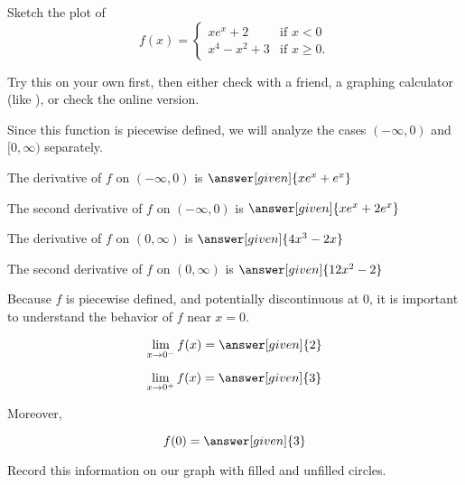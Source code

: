 \documentclass{ximera}
\begin{document}
\begin{example}
\begin{explanation}
\begin{hint}
\end{hint}

\end{explanation}
\end{example}

\begin{example}
Sketch the plot of 
\[
f(x) = \begin{cases} xe^x+2 &\text{if $x<0$} \\
x^4-x^2+3 &\text{if $x \geq 0$}.
\end{cases}
\]
\begin{explanation}

 Try this on your own first, then either check with a friend, a graphing calculator (like ), or check the online version.

\begin{hint}
	Since this function is piecewise defined, we will analyze the cases $(-\infty,0)$ and $[0,\infty)$ separately.
\end{hint}

\begin{hint}
		The derivative of $f$ on $(-\infty, 0)$ is $\answer[given]{xe^x+e^x}$
		
		The second derivative of $f$ on $(-\infty, 0)$ is $\answer[given]{xe^x+2e^x}$

		The derivative of $f$ on $(0, \infty)$ is $\answer[given]{4x^3-2x}$

		The second derivative of $f$ on $(0, \infty)$ is $\answer[given]{12x^2-2}$

\end{hint}

\begin{hint}
	Because $f$ is piecewise defined, and potentially discontinuous at $0$, it is important to understand the behavior of $f$ near $x = 0$.
	
	\[
		\lim_{x \to 0^-} f(x) = \answer[given]{2}
	\]
	
	\[
		\lim_{x \to 0^+} f(x) = \answer[given]{3}
	\]
	
	Moreover, 
	
	\[
	f(0) = \answer[given]{3}
	\]
	
	Record this information on our graph with filled and unfilled circles.
	\end{hint}
	

\end{explanation}
\end{example}
\end{document}
